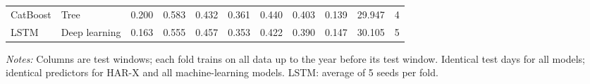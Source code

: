 \begin{table}[htbp]
{\begin{tabular}{llrrrrrrrrr}
CatBoost & Tree & 0.200 & 0.583 & 0.432 & 0.361 & 0.440 & 0.403 & 0.139 & 29.947 & 4 \\
LSTM & Deep learning & 0.163 & 0.555 & 0.457 & 0.353 & 0.422 & 0.390 & 0.147 & 30.105 & 5 \\
\bottomrule
\end{tabular}%
}
\par\vspace{2pt}\footnotesize\textit{Notes:} Columns are test windows; each fold trains on all data up to the year before its test window. Identical test days for all models; identical predictors for HAR-X and all machine-learning models. LSTM: average of 5 seeds per fold.
\end{table}

